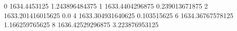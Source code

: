 0 1634.4453125 1.243896484375
1 1633.4404296875 0.239013671875
2 1633.201416015625 0.0
4 1633.304931640625 0.103515625
6 1634.36767578125 1.166259765625
8 1636.42529296875 3.223876953125
